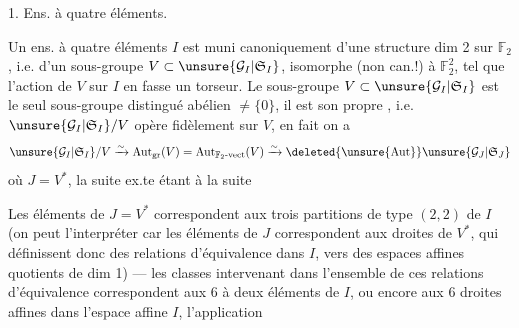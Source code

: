 1. Ens. à quatre éléments.

Un ens. à quatre éléments $I$ est muni canoniquement d'une structure
 dim 2 sur $\mathbb{F}_2$, i.e. d'un sous-groupe
$V\subset \unsure{\mathcal{G}_I|\mathfrak{S}_I}$, isomorphe (non can.!) à $\mathbb{F}_2^2$,
tel que l'action de $V$ sur  $I$ en fasse un torseur.
Le sous-groupe $V\subset \unsure{\mathcal{G}_I|\mathfrak{S}_I}$ est le seul sous-groupe
distingué abélien $\ne\{0\}$,  il est son propre
, i.e.
$\unsure{\mathcal{G}_I|\mathfrak{S}_I}/V$ opère fidèlement sur $V$, en fait on a
\[
 \unsure{\mathcal{G}_I|\mathfrak{S}_I}/V
 \xrightarrow{\sim}\operatorname{Aut}_{\mathrm{gr}}(V)
 =\operatorname{Aut}_{\mathbb{F}_2\text{-vect}}(V)
 \xrightarrow{\sim}\deleted{\unsure{\operatorname{Aut}}}\unsure{\mathcal{G}_J|\mathfrak{S}_J}
\]
où $J=V^*$, la suite ex.te
étant  à la suite

Les  éléments de $J=V^*$ correspondent aux trois
partitions de type $(2,2)$ de $I$ 
(on peut l'interpréter  car les éléments de $J$ correspondent
aux droites  de $V^*$, qui définissent
 donc des  relations d'équivalence
dans $I$, vers des espaces affines quotients de dim 1) --- les classes
intervenant dans l'ensemble de ces  relations d'équivalence
correspondent aux 6 
à deux éléments de $I$, ou encore aux 6 droites affines dans l'espace affine $I$,
l'application
